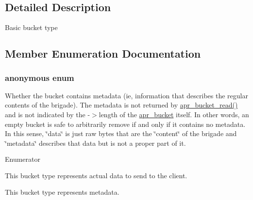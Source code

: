 \subsection{Detailed Description}
Basic bucket type 

\subsection{Member Enumeration Documentation}
\hypertarget{structapr__bucket__type__t_a117f85e4a58c5e7d7e373705ad138f85}{\subsubsection[{anonymous enum}]{\setlength{\rightskip}{0pt plus 5cm}anonymous enum}}\label{structapr__bucket__type__t_a117f85e4a58c5e7d7e373705ad138f85}
Whether the bucket contains metadata (ie, information that describes the regular contents of the brigade). The metadata is not returned by \hyperlink{group___a_p_r___util___bucket___brigades_gae44ae938c6c60e148430fdb098dcf28f}{apr\-\_\-bucket\-\_\-read()} and is not indicated by the -\/$>$length of the \hyperlink{structapr__bucket}{apr\-\_\-bucket} itself. In other words, an empty bucket is safe to arbitrarily remove if and only if it contains no metadata. In this sense, \char`\"{}data\char`\"{} is just raw bytes that are the \char`\"{}content\char`\"{} of the brigade and \char`\"{}metadata\char`\"{} describes that data but is not a proper part of it. \begin{Desc}
\item[Enumerator]\par
\begin{description}
\item[{\em 
\hypertarget{structapr__bucket__type__t_a117f85e4a58c5e7d7e373705ad138f85a53d3ef9d6a275fe2b72a91acea7017d5}{A\-P\-R\-\_\-\-B\-U\-C\-K\-E\-T\-\_\-\-D\-A\-T\-A}\label{structapr__bucket__type__t_a117f85e4a58c5e7d7e373705ad138f85a53d3ef9d6a275fe2b72a91acea7017d5}
}]This bucket type represents actual data to send to the client. \item[{\em 
\hypertarget{structapr__bucket__type__t_a117f85e4a58c5e7d7e373705ad138f85a9bf38b4eb3ea41c4af230432ac7a5fb1}{A\-P\-R\-\_\-\-B\-U\-C\-K\-E\-T\-\_\-\-M\-E\-T\-A\-D\-A\-T\-A}\label{structapr__bucket__type__t_a117f85e4a58c5e7d7e373705ad138f85a9bf38b4eb3ea41c4af230432ac7a5fb1}
}]This bucket type represents metadata. \end{description}
\end{Desc}


